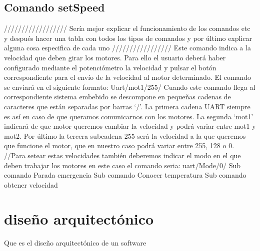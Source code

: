 \subsection{Comando setSpeed}
//////////////////
Sería mejor explicar el funcionamiento de los comandos etc y después hacer una tabla con todos los tipos de comandos y por último explicar alguna cosa especifica de cada uno
/////////////////
Este comando indica a la velocidad que deben girar los motores. Para ello el usuario deberá haber configurado mediante el potenciómetro la velocidad y pulsar el botón correspondiente para el envío de la velocidad al motor determinado. El comando se enviará en el siguiente formato:
	Uart/mot1/255/
Cuando este comando llega al correspondiente sistema embebido se descompone en pequeñas cadenas de caracteres que están separadas por barras ‘/’. La primera cadena UART siempre es así en caso de que queramos comunicarnos con los motores. La segunda ‘mot1’ indicará de que motor queremos cambiar la velocidad y podrá variar entre mot1 y mot2. Por último la tercera subcadena 255 será la velocidad a la que queremos que funcione el motor, que en nuestro caso podrá variar entre 255, 128 o 0.
//Para setear estas velocidades también deberemos indicar el modo en el que deben trabajar los motores en este caso el comando seria: uart/Mode/0/
Sub comando Parada emergencia
Sub comando Conocer temperatura
Sub comando obtener velocidad 


\section{diseño arquitectónico}
Que es el diseño arquitectónico de un software

